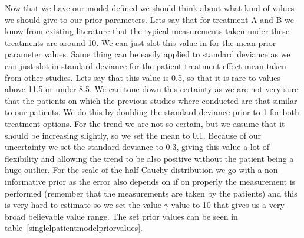 \documentclass[12pt,a4paper,leqno]{report}
\theoremstyle{plain}
\theoremstyle{definition}
\theoremstyle{remark}
\begin{document}
\bigskip
{}
\bigskip

Now that we have our model defined we should think about what kind of values we should
give to our prior parameters. Lets say that for treatment A and B we know from existing
literature that the typical measurements taken under these treatments are around 10. We
can just slot this value in for the mean prior parameter values. Same thing can be
easily applied to standard deviance as we can just slot in standard deviance for the
patient treatment effect mean taken from other studies. Lets say that this value is
0.5, so that it is rare to values above 11.5 or under 8.5. We can tone down this certainty
as we are not very sure that the patients on which the previous studies where conducted
are that similar to our patients. We do this by doubling the standard deviance prior to 1 for both
treatment options. For the trend we are not so certain, but we assume that it should be
increasing slightly, so we set the mean to 0.1. Because of our uncertainty we set the
standard deviance to 0.3, giving this value a lot of flexibility and allowing the trend to be also
positive without the patient being a huge outlier. For the scale of the half-Cauchy
distribution we go with a non-informative prior as the error also depends on if on
properly the measurement is performed (remember that the measurements are taken by the
patients) and this is very hard to estimate so we set the value \(\gamma \) value to 10
that gives us a very broad believable value range. The set prior values can be seen
in table\ \ref{singlelpatientmodelpriorvalues}.
\end{document}
